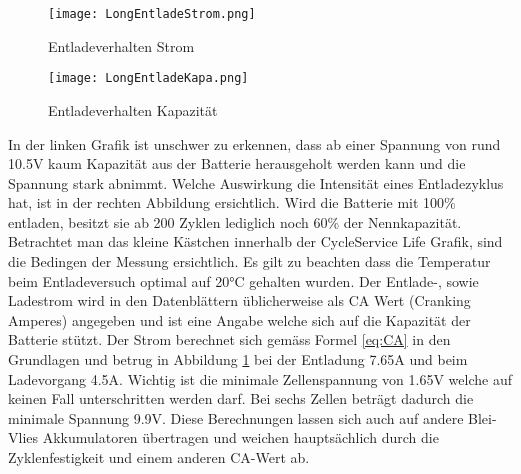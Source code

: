 \begin{figure}[H]
	\centering
	\begin{minipage}[h]{.48\linewidth} %
		\centering
		\texttt{[image: LongEntladeStrom.png]}
		\caption[Batterie Entladeverhalten Strom]{Entladeverhalten Strom}
		\label{fig:EntladeStrom}
	\end{minipage}
	\quad %
	\begin{minipage}[h]{.48\linewidth} %
		\centering
		\texttt{[image: LongEntladeKapa.png]}
		\caption[Batterie Entladeverhalten Kapazität]{Entladeverhalten Kapazität}
		\label{fig:EntladeKapazität}
	\end{minipage}
\end{figure}

In der linken Grafik ist unschwer zu erkennen, dass ab einer Spannung von rund 10.5V kaum Kapazität aus der Batterie herausgeholt werden kann und die Spannung stark abnimmt. Welche Auswirkung die Intensität eines Entladezyklus hat, ist in der rechten Abbildung ersichtlich. Wird die Batterie mit 100\% entladen, besitzt sie ab 200 Zyklen lediglich noch 60\% der Nennkapazität. Betrachtet man das kleine Kästchen innerhalb der \glqq Cycle\grqq Service Life Grafik, sind die Bedingen der Messung ersichtlich. Es gilt zu beachten dass die Temperatur beim Entladeversuch optimal auf 20°C gehalten wurden. Der Entlade-, sowie Ladestrom wird in den Datenblättern üblicherweise als CA Wert (Cranking Amperes) angegeben und ist eine Angabe welche sich auf die Kapazität der Batterie stützt. Der Strom berechnet sich gemäss Formel \ref{eq:CA} in den Grundlagen und betrug in Abbildung \ref{fig:EntladeKapazität} bei der Entladung 7.65A und beim Ladevorgang 4.5A. Wichtig ist die minimale Zellenspannung von 1.65V welche auf keinen Fall unterschritten werden darf. Bei sechs Zellen beträgt dadurch die minimale Spannung 9.9V. Diese Berechnungen lassen sich auch auf andere Blei-Vlies Akkumulatoren übertragen und weichen hauptsächlich durch die Zyklenfestigkeit und einem anderen CA-Wert ab.